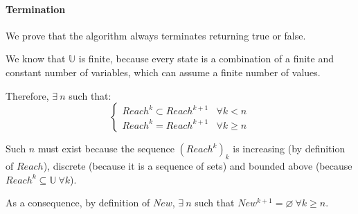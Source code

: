 \documentclass[12pt]{article}
\begin{document}



    \paragraph{Termination}
    We prove that the algorithm always terminates returning true or false.
    
    We know that $\mathbb U$ is finite, because every state is a combination of a finite and constant number of variables, which can assume a finite number of values.

    Therefore, $\exists\ n$ such that:
    $$
    \begin{cases}
          Reach^k \subset Reach^{k+1} & \forall k < n \\
          Reach^k = Reach^{k+1} & \forall k \geq n
    \end{cases}
    $$

    Such $n$ must exist because the sequence $(Reach^k)_k$ is increasing (by definition of $Reach$), discrete (because it is a sequence of sets) and bounded above (because $Reach^k \subseteq \mathbb U\ \forall k$).

    As a consequence, by definition of $New$, $\exists\ n$ such that $New^{k+1} = \varnothing\ \forall k \geq n$.
\end{document}
